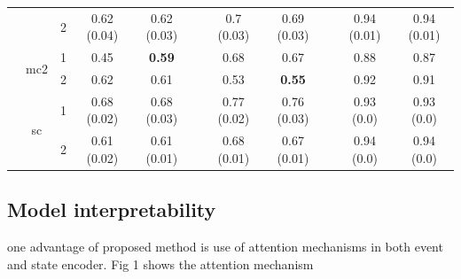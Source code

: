 \documentclass[journal,twoside,web]{ieeecolor}
\begin{document}
\begin{table}[htbp]
\begin{tabular}{ccccccccccc}
            &       & 2     & 0.62 (0.04) & 0.62 (0.03) &       & 0.7 (0.03) & 0.69 (0.03) &       & 0.94 (0.01) & 0.94 (0.01) \\
  \cmidrule{2-11}          & \multirow{2}[2]{*}{mc2} & 1     & 0.45  & \textbf{0.59} &       & 0.68  & 0.67  &       & 0.88  & 0.87 \\
            &       & 2     & 0.62  & 0.61  &       & 0.53  & \textbf{0.55} &       & 0.92  & 0.91 \\
  \cmidrule{2-11}          & \multirow{2}[2]{*}{sc} & 1     & 0.68 (0.02) & 0.68 (0.03) &       & 0.77 (0.02) & 0.76 (0.03) &       & 0.93 (0.0) & 0.93 (0.0) \\
            &       & 2     & 0.61 (0.02) & 0.61 (0.01) &       & 0.68 (0.01) & 0.67 (0.01) &       & 0.94 (0.0) & 0.94 (0.0) \\
      \bottomrule
      \bottomrule
      \end{tabular}%
    \label{tab:3}%
  \end{table}%
  
  




  
  \subsection{Model interpretability}
  
  
  one advantage of proposed method is use of attention mechanisms in both event and state encoder.
  Fig 1 shows the attention mechanism
  
\end{document}
